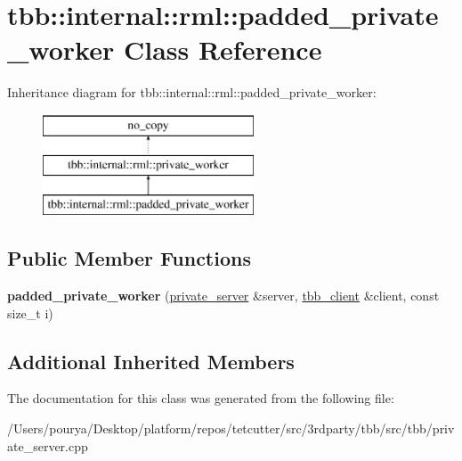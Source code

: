 \hypertarget{classtbb_1_1internal_1_1rml_1_1padded__private__worker}{}\section{tbb\+:\+:internal\+:\+:rml\+:\+:padded\+\_\+private\+\_\+worker Class Reference}
\label{classtbb_1_1internal_1_1rml_1_1padded__private__worker}
Inheritance diagram for tbb\+:\+:internal\+:\+:rml\+:\+:padded\+\_\+private\+\_\+worker\+:\begin{figure}[H]
\begin{center}
\leavevmode
\includegraphics[height=3.000000cm]{classtbb_1_1internal_1_1rml_1_1padded__private__worker}
\end{center}
\end{figure}
\subsection*{Public Member Functions}
\begin{DoxyCompactItemize}
\item 
\hypertarget{classtbb_1_1internal_1_1rml_1_1padded__private__worker_af82bc89002b70605295d42909da4063d}{}{\bfseries padded\+\_\+private\+\_\+worker} (\hyperlink{classtbb_1_1internal_1_1rml_1_1private__server}{private\+\_\+server} \&server, \hyperlink{classtbb_1_1internal_1_1rml_1_1tbb__client}{tbb\+\_\+client} \&client, const size\+\_\+t i)\label{classtbb_1_1internal_1_1rml_1_1padded__private__worker_af82bc89002b70605295d42909da4063d}

\end{DoxyCompactItemize}
\subsection*{Additional Inherited Members}


The documentation for this class was generated from the following file\+:\begin{DoxyCompactItemize}
\item 
/\+Users/pourya/\+Desktop/platform/repos/tetcutter/src/3rdparty/tbb/src/tbb/private\+\_\+server.\+cpp\end{DoxyCompactItemize}
